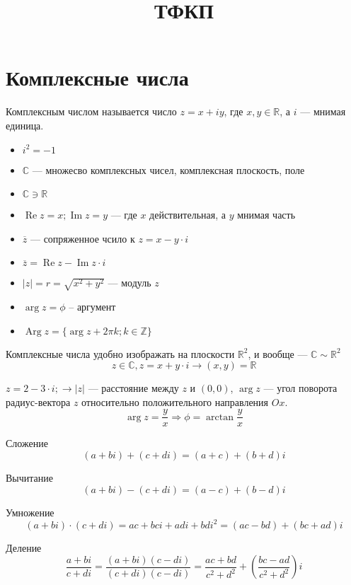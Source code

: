 \documentclass[oneside,final,14pt]{extreport}
\begin{document}
\title{ТФКП}

\maketitle

\chapter*{Комплексные числа}

Комплексным числом называется число $z=x+iy$, где $x,y\in \mathbb{R}$, а $i$ --- мнимая единица.
\begin{itemize}
	\item $i^2=-1$
	\item $\mathbb{C}$ --- множесво комплексных чисел, комплексная плоскость, поле
	\item $\mathbb{C} \ni \mathbb{R}$
	\item $\operatorname{Re} z = x ; \operatorname{Im} z = y$ --- где $x$ действительная, а $y$ мнимая часть
	\item $\overline{z}$ --- сопряженное чсило к $z = x - y \cdot i$
	\item $\overline{z} = \operatorname{Re} z - \operatorname{Im} z \cdot i$
	\item $|z| = r = \sqrt{x^2+y^2}$ --- модуль $z$
	\item $\operatorname{arg} z = \phi$ -- аргумент
	\item $\operatorname{Arg} z = \{\operatorname{arg} z + 2 \pi k; k \in \mathbb{Z}\}$
\end{itemize}

Комплексные числа удобно изображать на плоскости $\mathbb{R}^2$, и вообще --- $\mathbb{C} \sim \mathbb{R}^2$
\[z \in \mathbb{C}, z =x + y \cdot i \longrightarrow (x,y)=\mathbb{R}\]

$z = 2 - 3\cdot i; \longrightarrow |z|$ --- расстояние между $z$ и $(0,0)$, $\operatorname{arg} z$ --- угол поворота радиус-вектора $z$ относительно положительного направления $Ox$. \[\operatorname{arg} z = \frac y x \Rightarrow \phi = \arctan \frac{y}{x} \]

Сложение
\[(a+bi)+(c+di)=(a+c)+(b+d)i\]

Вычитание
\[(a+bi)-(c+di)=(a-c)+(b-d)i\]

Умножение
\[(a+bi)\cdot(c+di)=ac+bci+adi+bdi^2=(ac-bd)+(bc+ad)i\]

Деление \[\frac{a+bi}{c+di}=\frac{(a+bi)(c-di)}{(c+di)(c-di)}=\frac{ac+bd}{c^2+d^2}+\left(\frac{bc-ad}{c^2+d^2}\right)i\]
\end{document}
